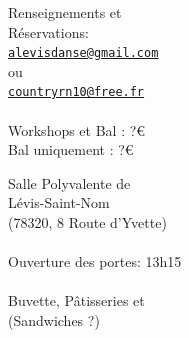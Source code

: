 \documentclass[12pt,a4paper]{article}
\begin{document}
\vspace*{-120mm}
\vfill

\begin{flushleft}
\fontsize{54pt}{54pt}
\selectfont
\end{flushleft}


\vspace*{60mm}
\vfill

\begin{minipage}[b]{0.48\linewidth}
\fontsize{20pt}{20pt}\selectfont
Renseignements et \\
Réservations: \\
\href{mailto:alevisdanse@gmail.com?subject=Stage Catalan 6 decembre}{\texttt{\color{blue!50!black}alevisdanse@gmail.com}} \\
ou\\
\href{mailto:countryrn10@free.fr?subject=Stage Catalan 6 decembre}{\texttt{\color{blue!50!black}countryrn10@free.fr}}\\
~\\
Workshops et Bal : ?\euro \\
Bal uniquement : ?\euro
\end{minipage}\hfill\begin{minipage}[b]{0.5\linewidth}
\fontsize{20pt}{20pt}\selectfont
\begin{flushright}
Salle Polyvalente de \\
Lévis-Saint-Nom\\
{\fontsize{14pt}{16pt}\selectfont
  (78320, 8 Route d'Yvette)}\\
~\\
    Ouverture des portes: 13h15\\
    ~\\
    Buvette, Pâtisseries et ~~~~~\\
    \fontsize{30pt}{30pt}\selectfont
    (Sandwiches ?)
  \end{flushright}
\end{minipage}
\end{document}
